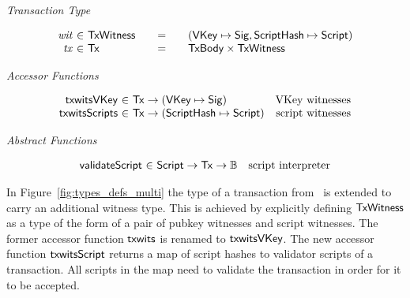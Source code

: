 \documentclass[11pt,a4paper,dvipsnames]{article}
\newcommand{\Bool}{\ensuremath{\mathbb{B}}}
\newcommand{\Tx}{\type{Tx}}
\newcommand{\TxWitness}{\type{TxWitness}}
\newcommand{\TxBody}{\type{TxBody}}
\newcommand{\HashScr}{\type{ScriptHash}}
\newcommand{\Script}{\type{Script}}
\newcommand{\VKey}{\type{VKey}}
\newcommand{\Sig}{\type{Sig}}
\theoremstyle{definition}
\begin{document}
\begin{figure*}[hbt]
  \emph{Transaction Type}

  \begin{equation*}
    \begin{array}{r@{~\in~}l@{\qquad=\qquad}l}
      \var{wit} & \TxWitness & (\VKey \mapsto \Sig, \HashScr \mapsto \Script)
      \\
      \var{tx}
      & \Tx
      & \TxBody \times \TxWitness
      \\
    \end{array}
  \end{equation*}

  \emph{Accessor Functions}

  \begin{equation*}
    \begin{array}{r@{~\in~}lr}
      \fun{txwitsVKey} & \Tx \to (\VKey \mapsto \Sig) & \text{VKey witnesses} \\
      \fun{txwitsScripts} & \Tx \to (\HashScr \mapsto \Script) & \text{script witnesses}
    \end{array}
  \end{equation*}

  \emph{Abstract Functions}

  \begin{equation*}
    \begin{array}{r@{~\in~}lr}
      \fun{validateScript} & \Script \to \Tx \to \Bool & \text{script interpreter}
    \end{array}
  \end{equation*}
  \caption{Types for Transaction Inputs with Scripts}
  \label{fig:types_defs_multi}
\end{figure*}

In Figure~\ref{fig:types_defs_multi} the type of a transaction
from~\cite{shelley_formal_spec} is extended to carry an additional witness
type. This is achieved by explicitly defining $\TxWitness$ as a type of the form
of a pair of pubkey witnesses and script witnesses. The former accessor function
$\mathsf{txwits}$ is renamed to $\mathsf{txwitsVKey}$. The new accessor function
$\mathsf{txwitsScript}$ returns a map of script hashes to validator scripts of a
transaction. All scripts in the map need to validate the transaction in order
for it to be accepted.
\end{document}
